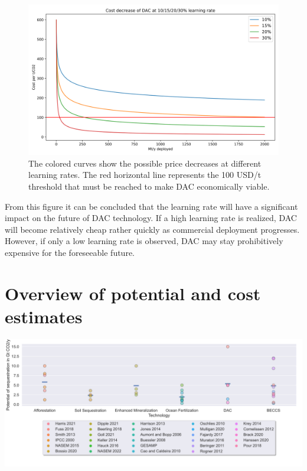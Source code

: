 \begin{figure}[ht!]
    \includegraphics[width=\textwidth]{figures/dac_learning.png}
    \caption{The colored curves show the possible price decreases at different learning rates. The red horizontal line represents the 100 USD/t threshold that must be reached to make DAC economically viable.}
\end{figure}
\newpage
\noindent From this figure it can be concluded that the learning rate will have a significant impact on the future of DAC technology. If a high learning rate is realized, DAC will become relatively cheap rather quickly as commercial deployment progresses. However, if only a low learning rate is observed, DAC may stay prohibitively expensive for the foreseeable future.

\chapter{Overview of potential and cost estimates}
 \mbox{} \begin{center}
    \begin{sideways}%
    \captionsetup{margin=0cm}
         \begin{minipage}{1.2\linewidth}
            \includegraphics[width=550pt, keepaspectratio]{figures/potential.png}
         \vspace{0.2cm}
         \label{fig:xx}
         \end{minipage}
    \end{sideways}
    \end{center}

